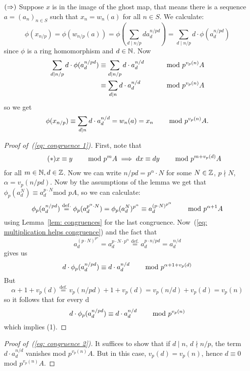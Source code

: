 \begin{bigproof}
    $(\Rightarrow)$ Suppose $x$ is in the image of the ghost map, that means there is a sequence 
    $a = (a_n)_{n \in S}$ such that $x_n = w_n(a)$ for all $n \in S$. 
    We calculate:
    \[
        \phi(x_{n/p}) = \phi(w_{n/p}(a)) = \phi(\sum_{d \mid n/p} d a_d^{n/pd}) =
        \sum_{d \mid n/p} d \cdot \phi(a_d^{n/pd}) 
    \] 
    since $\phi$ is a ring homomorphism and $d \in \mathbb{N}$.
    Now
    \begin{align}
        \label{eq: congruence 1}
        \sum_{d \mid n/p} d \cdot \phi(a_d^{n/pd}) 
        &\equiv
        \sum_{d \mid n/p} d \cdot a_d^{n/d} &\text{\hskip8mm mod} \ p^{v_p(n)}A \\
        \label{eq: congruence 2}
        &\equiv \sum_{d \mid n} d \cdot a_d^{n/d} &\text{\hskip8mm mod} \ p^{v_p(n)}A
    \end{align}
    so we get
    \[
        \phi(x_{n/p}) \equiv \sum_{d \mid n} d \cdot a_d^{n/d} = w_n(a) = x_n \text{\hskip8mm mod} \ p^{v_p(n)}A.
        \]
    \begin{proof}[Proof of~(\ref{eq: congruence 1})]
    First, note that 
\begin{align}\label{eq: multiplication helps congruence} \tag{$\ast$}
        x \equiv y \text{\hskip8mm mod }p^mA \implies dx \equiv dy \text{\hskip8mm mod } p^{m+v_p(d)}A
    \end{align}
    for all $m \in \mathbb{N}, d \in \mathbb{Z}$.
    Now we can write $n/pd = p^{\alpha} \cdot N$ for some $N \in \mathbb{Z}$,
    $p \nmid N$, $\alpha = v_p(n/pd)$. 
    Now by the assumptions of the lemma we get that $\phi_p(a_d^N)
    \equiv a_d^{p \cdot N} \text{mod }pA$, so we can calculate:
    \[
        \phi_p(a_d^{n/pd}) \overset{\mathrm{def.}}{=} \phi_p(a_d^{p^{\alpha} \cdot N})
        = \phi_p(a_d^N)^{p^{\alpha}} \equiv a_d^{(p\cdot N)^{p^{\alpha}}} \text{\hskip8mm mod } p^{\alpha +1}A
    \]
    using Lemma~\ref{lem: congruences} for the last congruence. 
    Now~(\ref{eq: multiplication helps congruence}) and the fact that
    \[
        a_d^{(p \cdot N)^{p^{\alpha}}} = a_d^{p \cdot N \cdot p^{\alpha}} 
        \overset{\mathrm{def.}}{=}
        a_d^{p \cdot n/pd} = a_d^{n/d} 
    \]
    gives us
    \[
        d \cdot \phi_p(a_d^{n/pd}) \equiv d \cdot a_d^{n/d} \text{\hskip8mm mod } p^{\alpha + 1 + v_p(d)}
    \]
    But 
    \[
        \alpha + 1 + v_p(d) \overset{\mathrm{def.}}{=} v_p(n/pd) + 1 + v_p(d)
        = v_p(n/d) + v_p(d) = v_p(n)
    \]
    so it follows that for every d 
    \[
        d \cdot \phi_p(a_d^{n/pd}) \equiv d \cdot a_d^{n/d} \text{\hskip8mm mod } p^{v_p(n)}
    \] 
    which implies (1).
    \end{proof}
    \begin{proof}[Proof of~(\ref{eq: congruence 2})]
        It suffices to show that if $d \mid n$, $d \nmid n/p$, the term 
        $d \cdot a_d^{n/d}$ vanishes mod $p^{v_p(n)}A$.
        But in this case, $v_p(d) = v_p(n)$, hence $d \equiv 0$ mod  $p^{v_p(n)}A$.
    \end{proof}  
    

\end{bigproof}
